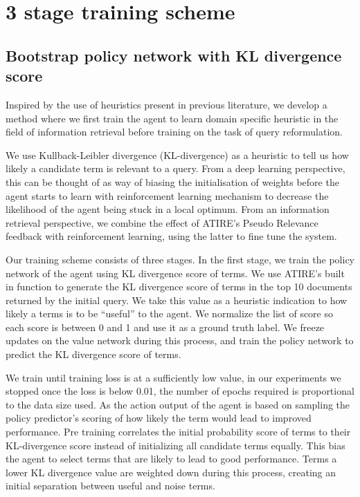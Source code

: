 \section{3 stage training scheme}

\subsection{Bootstrap policy network with KL divergence score}
Inspired by the use of heuristics present in previous literature, we develop a method where we first train the agent to learn domain specific heuristic in the field of information retrieval before training on the task of query reformulation. 

We use Kullback-Leibler divergence (KL-divergence) as a heuristic to tell us how likely a candidate term is relevant to a query. From a deep learning perspective, this can be thought of as way of biasing the initialisation of weights before the agent starts to learn with reinforcement learning mechanism to decrease the likelihood of the agent being stuck in a local optimum. From an information retrieval perspective, we combine the effect of ATIRE's Pseudo Relevance feedback with reinforcement learning, using the latter to fine tune the system.

Our training scheme consists of three stages.  In the first stage, we train the policy network of the agent using KL divergence score of terms.  We use ATIRE’s built in function to generate the KL divergence score of terms in the top 10 documents returned by the initial query. We take this value as a heuristic indication to how likely a terms is to be ``useful'' to the agent. We normalize the list of score so each score is between 0 and 1 and use it as a ground truth label. We freeze updates on the value network during this process, and train the policy network to predict the KL divergence score of terms. 

We train until training loss is at a sufficiently low value, in our experiments we stopped once the loss is below 0.01, the number of epochs required is proportional to the data size used. As the action output of the agent is based on sampling the policy predictor's scoring of how likely the term would lead to improved performance. Pre training correlates the initial probability score of terms to their KL-divergence score instead of initializing all candidate terms equally. This bias the agent to select terms that are likely to lead to good performance. Terms a lower KL divergence value are weighted down during this process, creating an initial separation between useful and noise terms. 


